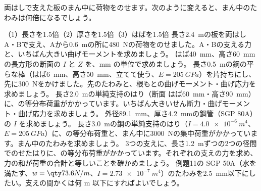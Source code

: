 

\bkendproblems
{}
\bkproblem 両はしで支えた板のまん中に荷物をのせます。次のように変えると、まん中のたわみは何倍になるでしょう。\par
（1）\nobreak 長さを1.5倍\quad（2）\nobreak 厚さを1.5倍\quad（3）\nobreak はばを1.5倍
\bkproblem 長さ\qty{2.4}{m}の板を両はしA・Bで支え、Aから\qty{0.6}{m}の所に\qty{480}{N}の荷物をのせました。A・Bの支える力と、いちばん大きい曲げモーメントを求めましょう。
\bkproblem はば\qty{40}{mm}、高さ\qty{60}{mm}の長方形の断面の $I$ と $Z$ を、mm の単位で求めましょう。
\bkproblem 長さ\qty{0.5}{m}の鋼の平らな棒（はば\qty{6}{mm}、高さ\qty{50}{mm}、立てて使う、$E=\qty{205}{GPa}$）を片持ちにし、先に\qty{300}{N}をかけました。先のたわみと、根もとの曲げモーメント・曲げ応力を求めましょう。
\bkproblem 長さ\qty{2.0}{m}の単純支持のはり（断面 はば\qty{60}{mm}・高さ\qty{90}{mm}）に、の等分布荷重がかかっています。いちばん大きいせん断力・曲げモーメント・曲げ応力を求めましょう。
\bkproblem 外径\qty{89.1}{mm}、厚さ\qty{4.2}{mm}の鋼管（SGP 80A）の $I$ を求めましょう。
\bkproblem 長さ\qty{3.0}{m}の鋼の単純支持のはり（$I=\qty{4.0e-6}{m^4}$、$E=\qty{205}{GPa}$）に、の等分布荷重と、まん中に\qty{3000}{N}の集中荷重がかかっています。まん中のたわみを求めましょう。
\bkproblem 3つの支えに、長さ\qty{1.2}{m}ずつの2つの径間でのせたはりに、の等分布荷重がかかっています。それぞれの支えの力を求め、力の和が荷重の合計と等しいことを確かめましょう。
\bkproblem 例題11の SGP 50A（水を満たす、$w=\pxkq{73.6}{N/m}$、$I=\qty{2.73e-7}{m^4}$）のたわみを\qty{2.5}{mm}以下にしたい。支えの間かくは何 m 以下にすればよいでしょう。

